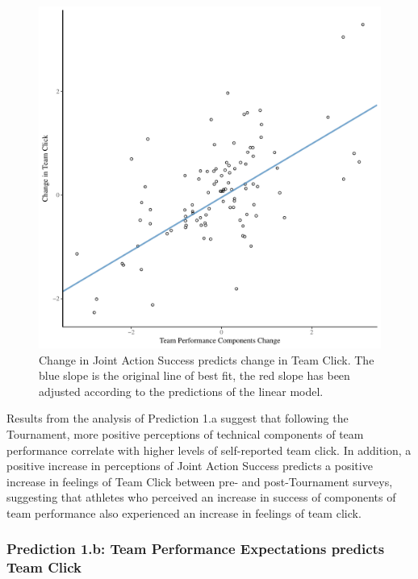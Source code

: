 

\begin{figure}[htbp]
  \centering
\includegraphics[scale=.5]{images/jasClickDeltaModelSlope}
  \caption{Change in Joint Action Success predicts change in Team Click. The blue slope is the original line of best fit, the red slope has been adjusted according to the predictions of the linear model.}
  \label{fig:jasClickDeltaModelSLope}
\end{figure}

Results from the analysis of Prediction 1.a suggest that following the Tournament, more positive perceptions of technical components of team performance correlate with higher levels of self-reported team click.  In addition, a positive increase in perceptions of Joint Action Success predicts a positive increase in feelings of Team Click between pre- and post-Tournament surveys, suggesting that athletes who perceived an increase in success of components of team performance also experienced an increase in feelings of team click.






\subsubsection{Prediction 1.b: Team Performance Expectations predicts Team Click}

